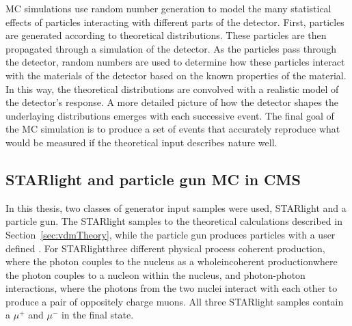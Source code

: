     MC simulations use random number generation to model the many statistical 
      effects of particles interacting with different parts of the detector. 
    First, particles are generated according to theoretical distributions.
    These particles are then propagated through a simulation of the detector.
    As the particles pass through the detector, random numbers are used
      to determine how these particles interact with the materials of the 
      detector based on the known properties of the material. 
    In this way, the theoretical distributions are convolved with a realistic 
      model of the detector's response. 
    A more detailed picture of how the detector shapes the underlaying 
      distributions emerges with each successive event.
    The final goal of the MC simulation is to produce a set of events that 
      accurately reproduce what would be measured if the theoretical input 
      describes nature well. 

  \subsection{STARlight and particle gun MC in CMS}
    In this thesis, two classes of generator input samples were used, 
      STARlight \DIFaddbegin {}\DIFaddend and a particle gun.
    The STARlight samples \DIFdelbegin {}\DIFdelend \DIFaddbegin {}\DIFaddend to the theoretical calculations 
      described in Section~\ref{sec:vdmTheory}, while the particle gun produces
      particles with a user defined \DIFdelbegin {}\DIFdelend \DIFaddbegin {}\JPsi{} 
      \DIFaddend . 
    For STARlight\DIFaddbegin \DIFadd{, }\DIFaddend three different physical process \DIFdelbegin {}\DIFdelend \DIFaddbegin {}\DIFaddend coherent \JPsi{} production, where the photon couples to the nucleus as
      a whole\DIFdelbegin \DIFdel{, }\DIFdelend \DIFaddbegin \DIFadd{; }\DIFaddend incoherent \JPsi{} production\DIFdelbegin \DIFdel{, }\DIFdelend \DIFaddbegin \DIFadd{; }\DIFaddend where the photon couples to a
      \DIFaddbegin {}\DIFaddend nucleon within the nucleus, and photon-photon interactions, where 
      the photons from the two nuclei interact with each other to produce a 
      pair of oppositely charge muons\DIFdelbegin {}\DIFdelend .
    All three STARlight samples contain a $\mu^{+}$ and $\mu^{-}$ in the final 
      state.
\DIFdelbegin {}%
\DIFdelend 

